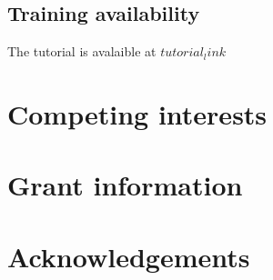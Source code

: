 \subsection*{Training availability}

The tutorial is avalaible at \href{$tutorial_link$}{$tutorial_link$}

\section*{Competing interests}

\section*{Grant information}

\section*{Acknowledgements}

{\small
}




